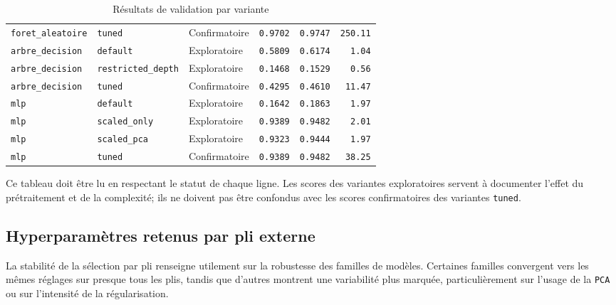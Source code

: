 \begin{table}[H]
\begin{tabular}{|l|l|l|r|r|r|}
\texttt{foret\_aleatoire} & \texttt{tuned} & Confirmatoire & \texttt{0.9702} & \texttt{0.9747} & \texttt{250.11} \\
\texttt{arbre\_decision} & \texttt{default} & Exploratoire & \texttt{0.5809} & \texttt{0.6174} & \texttt{1.04} \\
\texttt{arbre\_decision} & \texttt{restricted\_depth} & Exploratoire & \texttt{0.1468} & \texttt{0.1529} & \texttt{0.56} \\
\texttt{arbre\_decision} & \texttt{tuned} & Confirmatoire & \texttt{0.4295} & \texttt{0.4610} & \texttt{11.47} \\
\texttt{mlp} & \texttt{default} & Exploratoire & \texttt{0.1642} & \texttt{0.1863} & \texttt{1.97} \\
\texttt{mlp} & \texttt{scaled\_only} & Exploratoire & \texttt{0.9389} & \texttt{0.9482} & \texttt{2.01} \\
\texttt{mlp} & \texttt{scaled\_pca} & Exploratoire & \texttt{0.9323} & \texttt{0.9444} & \texttt{1.97} \\
\texttt{mlp} & \texttt{tuned} & Confirmatoire & \texttt{0.9389} & \texttt{0.9482} & \texttt{38.25} \\
\hline
\end{tabular}
\caption{Résultats de validation par variante}
\end{table}

Ce tableau doit être lu en respectant le statut de chaque ligne. Les scores des variantes exploratoires servent à documenter l'effet du prétraitement et de la complexité; ils ne doivent pas être confondus avec les scores confirmatoires des variantes \texttt{tuned}.

\subsection{Hyperparamètres retenus par pli externe}
La stabilité de la sélection par pli renseigne utilement sur la robustesse des familles de modèles. Certaines familles convergent vers les mêmes réglages sur presque tous les plis, tandis que d'autres montrent une variabilité plus marquée, particulièrement sur l'usage de la \texttt{PCA} ou sur l'intensité de la régularisation.

